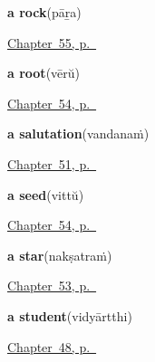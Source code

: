 \noindent\begin{minipage}[t]{\linewidth}
\raggedright
\textbf{a rock}\enspace\emph{}\enspace(pāṟa)\par
\footnotesize \hyperref[ch:ml-ground-underfoot]{Chapter~55, p.~\pageref*{ch:ml-ground-underfoot}}
\end{minipage}\par\smallskip

\noindent\begin{minipage}[t]{\linewidth}
\raggedright
\textbf{a root}\enspace\emph{}\enspace(vērŭ)\par
\footnotesize \hyperref[ch:ml-a-tree-part-by-part]{Chapter~54, p.~\pageref*{ch:ml-a-tree-part-by-part}}
\end{minipage}\par\smallskip

\noindent\begin{minipage}[t]{\linewidth}
\raggedright
\textbf{a salutation}\enspace\emph{}\enspace(vandanaṁ)\par
\footnotesize \hyperref[ch:ml-courtesy]{Chapter~51, p.~\pageref*{ch:ml-courtesy}}
\end{minipage}\par\smallskip

\noindent\begin{minipage}[t]{\linewidth}
\raggedright
\textbf{a seed}\enspace\emph{}\enspace(vittŭ)\par
\footnotesize \hyperref[ch:ml-a-tree-part-by-part]{Chapter~54, p.~\pageref*{ch:ml-a-tree-part-by-part}}
\end{minipage}\par\smallskip

\noindent\begin{minipage}[t]{\linewidth}
\raggedright
\textbf{a star}\enspace\emph{}\enspace(nakṣatraṁ)\par
\footnotesize \hyperref[ch:ml-overhead]{Chapter~53, p.~\pageref*{ch:ml-overhead}}
\end{minipage}\par\smallskip

\noindent\begin{minipage}[t]{\linewidth}
\raggedright
\textbf{a student}\enspace\emph{}\enspace(vidyārtthi)\par
\footnotesize \hyperref[ch:ml-roles]{Chapter~48, p.~\pageref*{ch:ml-roles}}
\end{minipage}\par\smallskip

